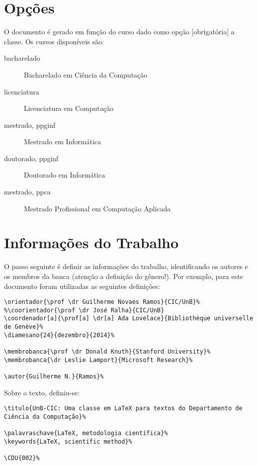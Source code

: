 \section{Opções}
O documento é gerado em função do curso dado como opção [obrigatória] a classe. 
Os cursos disponíveis são:
\begin{description}
  \item[bacharelado] Bacharelado em Ciência da Computação
  \item[licenciatura] Licenciatura em Computação
  \item[mestrado, ppginf] Mestrado em Informática
  \item[doutorado, ppginf] Doutorado em Informática
  \item[mestrado, ppca] Mestrado Profissional em Computação Aplicada
\end{description}



\section{Informações do Trabalho}%
O passo seguinte é definir as informações do trabalho, identificando os autores 
e os membros da banca (atenção a definição do gênero!). Por exemplo, para este
documento foram utilizadas as seguintes definições:

\begin{verbatim}
\orientador{\prof \dr Guilherme Novaes Ramos}{CIC/UnB}%
%\coorientador{\prof \dr José Ralha}{CIC/UnB}
\coordenador[a]{\prof[a] \dr[a] Ada Lovelace}{Bibliothèque universelle de Genève}%
\diamesano{24}{dezembro}{2014}%

\membrobanca{\prof \dr Donald Knuth}{Stanford University}%
\membrobanca{\dr Leslie Lamport}{Microsoft Research}%

\autor{Guilherme N.}{Ramos}%
\end{verbatim}

Sobre o texto, definiu-se:
\begin{verbatim}
\titulo{UnB-CIC: Uma classe em LaTeX para textos do Departamento de 
Ciência da Computação}%

\palavraschave{LaTeX, metodologia científica}%
\keywords{LaTeX, scientific method}%

\CDU{002}%
\end{verbatim}

